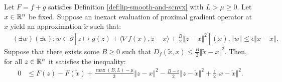 \documentclass[12pt]{article}
\begin{document}
        \begin{lemma}\label{lemma:inex-pg-ineq}
            Let $F = f + g$ satisfies Definition \ref{def:lip-smooth-and-scnvx} with $L > \mu \ge 0$. 
            Let $x \in \mathbb R^n$ be fixed. 
            Suppose an inexact evaluation of proximal gradient operator at $x$ yield an approximation $\tilde x$ such that: 
            \begin{align*}
                & (\exists w)(\exists \epsilon ): w \in \partial \left[
                    z \mapsto  g(z) + \langle \nabla f(x), z - x\rangle + \frac{B}{2}\Vert z - x\Vert^2
                \right](\tilde x), \Vert w\Vert \le \epsilon \Vert x - \tilde x\Vert. 
            \end{align*}
            Suppose that there exists some $B \ge 0$ such that $D_f(\tilde x, x) \le \frac{B}{2}\Vert \tilde x - x\Vert^2$. 
            Then, for all $z\in \mathbb R^n$ it satisfies the inequality: 
            \begin{align*}
                0 &\le 
                F(z) - F(\tilde x) + \frac{\max(B, L) - \mu}{2}\Vert z - x\Vert^2
                - \frac{B - \epsilon}{2}\Vert z - \tilde x\Vert^2
                + \frac{\epsilon}{2}\Vert x - \tilde x \Vert^2. 
            \end{align*}
        \end{lemma}
\end{document}
